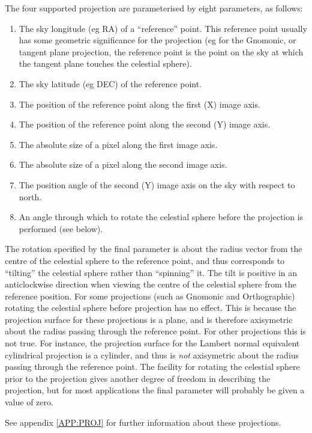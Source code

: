 The four supported projection are parameterised by eight parameters, as 
follows: 
\begin {enumerate}
\item The sky longitude (eg RA) of a ``reference'' point. This reference point 
usually has some geometric significance for the projection (eg for the Gnomonic,
or tangent plane projection, the reference point is the point on the sky at 
which the tangent plane touches the celestial sphere).
\item The sky latitude (eg DEC) of the reference point.
\item The position of the reference point along the first (X) image axis.
\item The position of the reference point along the second (Y) image axis.
\item The absolute size of a pixel along the first image axis.
\item The absolute size of a pixel along the second image axis.
\item The position angle of the second (Y) image axis on the sky with respect to
north.
\item An angle through which to rotate the celestial sphere before the
projection is performed (see below). 
\end {enumerate}

The rotation specified by the final parameter is about the radius vector from
the centre of the celestial sphere to the reference point, and thus corresponds
to ``tilting'' the celestial sphere rather than ``spinning'' it. The tilt is
positive in an anticlockwise direction when viewing the centre of the celestial
sphere from the reference position. For some projections (such as Gnomonic and
Orthographic) rotating the celestial sphere before projection has no effect.
This is because the projection surface for these projections is a plane, and is
therefore axisymetric about the radius passing through the reference point. For
other projections this is not true. For instance, the projection surface for the
Lambert normal equivalent cylindrical projection is a cylinder, and thus is {\em
not} axisymetric about the radius passing through the reference point. The
facility for rotating the celestial sphere prior to the projection gives another
degree of freedom in describing the projection, but for most applications the
final parameter will probably be given a value of zero.

See appendix \ref {APP:PROJ} for further information about these projections.

